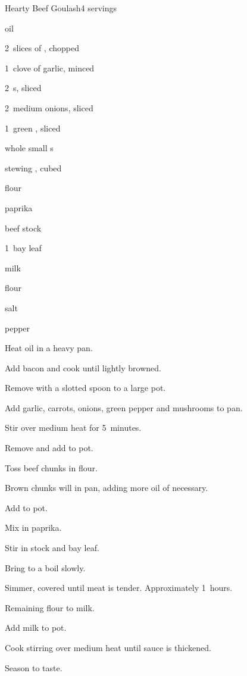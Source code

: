 \begin{recipe}{Hearty Beef Goulash}{}{4 servings}

\begin{ingredients}
\item {} oil
\item 2~slices of , chopped 
\item 1~clove of garlic, minced 
\item 2~s, sliced 
\item 2~medium onions, sliced 
\item 1~green , sliced 
\item \lbs{\quarter} whole small s
\item \lbs{1\half} stewing , cubed 
\item \C{\quarter} flour
\item {} paprika
\item {} beef stock
\item 1~bay leaf
\item {} milk
\item {} flour
\item salt
\item pepper
\end{ingredients}

\begin{directions}
\item Heat oil in a heavy pan.
\item Add bacon and cook until lightly browned.
\item Remove with a slotted spoon to a large pot.
\item Add garlic, carrots, onions, green pepper and mushrooms to pan.
\item Stir over medium heat for 5~minutes.
\item Remove and add to pot.
\item Toss beef chunks in flour.
\item Brown chunks will in pan, adding more oil of necessary.
\item Add to pot.
\item Mix in paprika.
\item Stir in stock and bay leaf.
\item Bring to a boil slowly.
\item Simmer, covered until meat is tender. Approximately 1\half~hours.
\item Remaining flour to milk.
\item Add milk to pot.
\item Cook stirring over medium heat until sauce is thickened.
\item Season to taste.
\end{directions}

\end{recipe}
